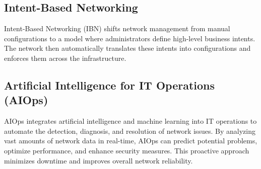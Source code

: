 \subsection{Intent-Based Networking}
Intent-Based Networking (IBN) shifts network management from manual configurations to a model where administrators define high-level business intents\cite{Manias2024Intent}. The network then automatically translates these intents into configurations and enforces them across the infrastructure.

\subsection{Artificial Intelligence for IT Operations (AIOps)}
AIOps integrates artificial intelligence and machine learning into IT operations to automate the detection, diagnosis, and resolution of network issues\cite{diaz2023aiops}. By analyzing vast amounts of network data in real-time, AIOps can predict potential problems, optimize performance, and enhance security measures. This proactive approach minimizes downtime and improves overall network reliability.